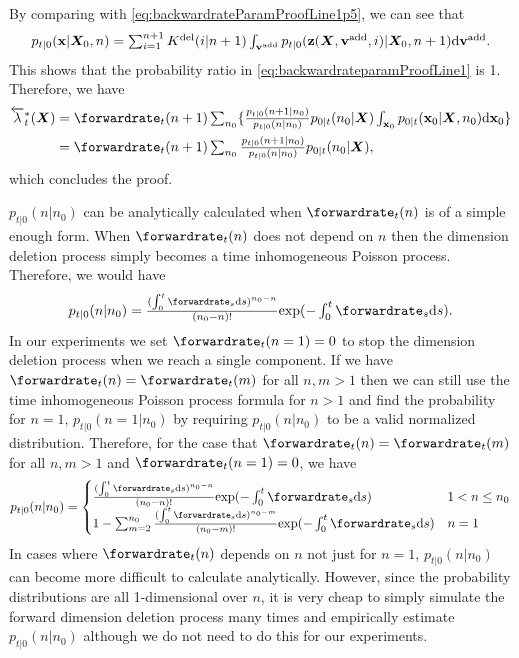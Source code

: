 By comparing with \eqref{eq:backwardrateParamProofLine1p5}, we can see that
\begin{align}
\textstyle     p_{t|0}({\mathbf{x}} | {\bm{X}}_0, n) = \sum_{i=1}^{n+1} K^{\text{del}}(i | n+1) \int_{{\mathbf{v}}^{\textup{add}}} p_{t|0}(\mathbf{z}({\bm{X}}, {\mathbf{v}}^{\textup{add}}, i) | {\bm{X}}_0, n+1) \mathrm{d} {\mathbf{v}}^{\textup{add}} . 
\end{align}
This shows that the probability ratio in \eqref{eq:backwardrateparamProofLine1} is 1. Therefore, we have
\begin{align}
       \backwardrate_t^*(\mX) &\textstyle = \forwardrate_t(n+1) \sum_{n_0} \{ \frac{p_{t|0}(n+1 | n_0)}{p_{t|0}(n | n_0)} p_{0|t}(n_0 | \mX) \int_{\rvx_0} p_{0|t}(\rvx_0 | \mX, n_0)\rmd \rvx_0 \}\\
       &\textstyle = \forwardrate_t(n+1) \sum_{n_0} \frac{p_{t|0}(n+1 | n_0)}{p_{t|0}(n | n_0)} p_{0|t}(n_0 | \mX) , 
\end{align}
which concludes the proof.

$p_{t|0}(n | n_0)$ can be analytically calculated when $\forwardrate_t(n)$ is of a simple enough form. When $\forwardrate_t(n)$ does not depend on $n$ then the dimension deletion process simply becomes a time inhomogeneous Poisson process. Therefore, we would have
\begin{equation}
\textstyle    p_{t|0}(n | n_0) = \frac{(\int_0^t \forwardrate_s \rmd s)^{n_0 - n}}{(n_0 - n)!} \text{exp}(- \int_0^t \forwardrate_s \rmd s) . 
\end{equation}
In our experiments we set $\forwardrate_t(n=1) = 0$ to stop the dimension deletion process when we reach a single component. If we have $\forwardrate_t(n) = \forwardrate_t(m)$ for all $n, m > 1$ then we can still use the time inhomogeneous Poisson process formula for $n > 1$ and find the probability for $n=1$, $p_{t|0}(n=1 | n_0)$ by requiring $p_{t|0}(n | n_0)$ to be a valid normalized distribution. Therefore, for the case that $\forwardrate_t(n) = \forwardrate_t(m)$ for all $n, m > 1$ and $\forwardrate_t(n=1) = 0$, we have
\begin{equation}
    p_{t|0}(n | n_0) = \begin{cases}
         \frac{(\int_0^t \forwardrate_s \rmd s)^{n_0 - n}}{(n_0 - n)!} \text{exp}(- \int_0^t \forwardrate_s \rmd s)&\textstyle  1 < n \leq n_0 \\
        1 -  \sum_{m=2}^{n_0} \frac{(\int_0^t \forwardrate_s \rmd s)^{n_0 - m}}{(n_0 - m)!} \text{exp}(- \int_0^t \forwardrate_s \rmd s)  &\textstyle  n = 1
    \end{cases}
\end{equation}
In cases where $\forwardrate_t(n)$ depends on $n$ not just for $n=1$, $p_{t|0}(n | n_0)$ can become more difficult to calculate analytically. However, since the probability distributions are all 1-dimensional over $n$, it is very cheap to simply simulate the forward dimension deletion process many times and empirically estimate $p_{t|0}(n | n_0)$ although we do not need to do this for our experiments.









